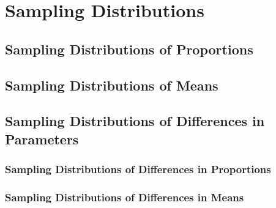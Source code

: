 \documentclass[../AP_Statistics.tex]{subfiles}
\begin{document}
	\chapter{Sampling Distributions}
		\section{Sampling Distributions of Proportions}
		\section{Sampling Distributions of Means}
		\section{Sampling Distributions of Differences in Parameters}
			\subsection{Sampling Distributions of Differences in Proportions}
			\subsection{Sampling Distributions of Differences in Means}
\end{document}
